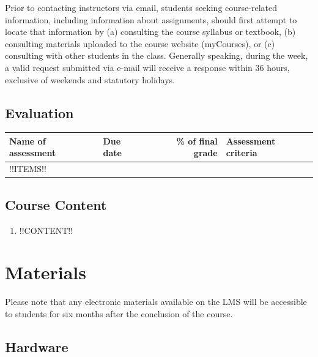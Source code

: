 \documentclass{article}
\begin{document}
Prior to contacting instructors via email, students seeking
course-related information, including information about assignments,
should first attempt to locate that information by (a) consulting the
course syllabus or textbook, (b) consulting materials uploaded to the
course website (myCourses), or (c) consulting with other students in
the class. Generally speaking, during the week, a valid request
submitted via e-mail will receive a response within 36 hours,
exclusive of weekends and statutory holidays.

\newpage

\subsection{Evaluation}
\label{eval}

\begin{center}
  \renewcommand{\arraystretch}{1.2}
  \begin{longtable}{|>{\raggedright}p{36mm}|>{\raggedright}p{26mm}|r|p{76mm}|}
    \hline
        {\bf Name of assessment}
        & {\bf Due date}
        & {\bf \% of final grade} 
        & {\bf Assessment criteria} \\
        \hline
        \endhead        
        !!ITEMS!! \\
        \hline
  \end{longtable}
\end{center}

\newpage

\subsection{Course Content}

\begin{enumerate}
\item{!!CONTENT!!}
\end{enumerate}

\newpage

\section{Materials}

Please note that any electronic materials available on the LMS will be
accessible to students for six months after the conclusion of the
course.

\subsection{Hardware}
\end{document}
